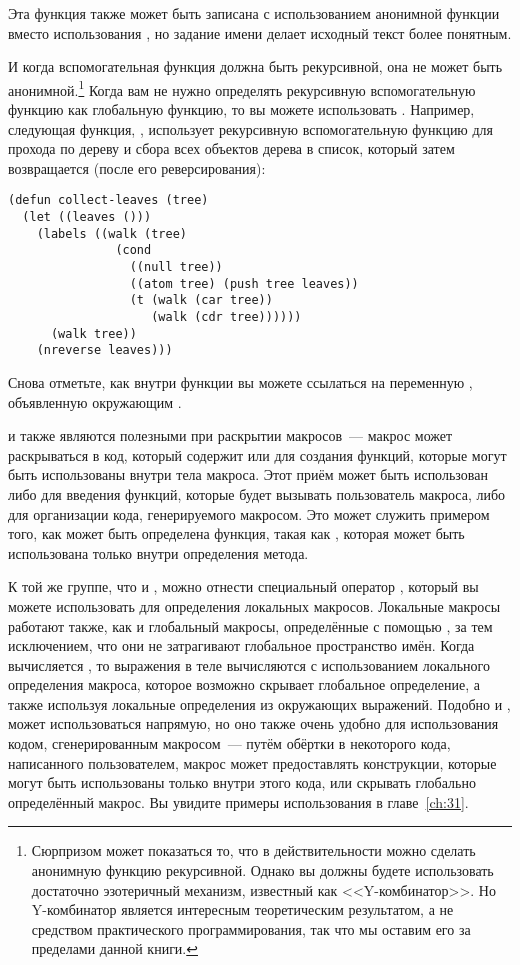 Эта функция также может быть записана с использованием анонимной функции вместо
использования , но задание имени делает исходный текст более понятным.

И когда вспомогательная функция должна быть рекурсивной, она не может быть
анонимной.\footnote{Сюрпризом может показаться то, что в действительности можно сделать
  анонимную функцию рекурсивной.  Однако вы должны будете использовать достаточно
  эзотеричный механизм, известный как <<Y-комбинатор>>.  Но Y-комбинатор является интересным
  теоретическим результатом, а не средством практического программирования, так что мы
  оставим его за пределами данной книги.}  Когда вам не нужно определять рекурсивную
вспомогательную функцию как глобальную функцию, то вы можете использовать .
Например, следующая функция, , использует рекурсивную вспомогательную
функцию  для прохода по дереву и сбора всех объектов дерева в список, который
затем возвращается  (после его реверсирования):

\begin{lstlisting}
(defun collect-leaves (tree)
  (let ((leaves ()))
    (labels ((walk (tree)
               (cond
                 ((null tree))
                 ((atom tree) (push tree leaves))
                 (t (walk (car tree))
                    (walk (cdr tree))))))
      (walk tree))
    (nreverse leaves)))
\end{lstlisting}


Снова отметьте, как внутри функции  вы можете ссылаться на переменную
, объявленную окружающим .

 и  также являются полезными при раскрытии макросов~--- макрос
может раскрываться в код, который содержит  или  для создания
функций, которые могут быть использованы внутри тела макроса.  Этот приём может быть
использован либо для введения функций, которые будет вызывать пользователь макроса, либо
для организации кода, генерируемого макросом.  Это может служить примером того, как может
быть определена функция, такая как , которая может быть
использована только внутри определения метода.

К той же группе, что  и , можно отнести специальный оператор
, который вы можете использовать для определения локальных
макросов. Локальные макросы работают также, как и глобальный макросы, определённые с
помощью , за тем исключением, что они не затрагивают глобальное
пространство имён.  Когда вычисляется , то выражения в теле вычисляются с
использованием локального определения макроса, которое возможно скрывает глобальное
определение, а также используя локальные определения из окружающих выражений.  Подобно
 и ,  может использоваться напрямую, но оно также
очень удобно для использования кодом, сгенерированным макросом~--- путём обёртки в
 некоторого кода, написанного пользователем, макрос может предоставлять
конструкции, которые могут быть использованы только внутри этого кода, или скрывать
глобально определённый макрос.  Вы увидите примеры использования  в
главе~\ref{ch:31}.

